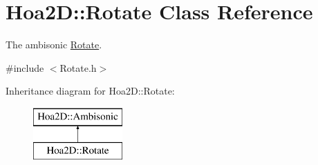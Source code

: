 \hypertarget{class_hoa2_d_1_1_rotate}{\section{Hoa2\-D\-:\-:Rotate Class Reference}
\label{class_hoa2_d_1_1_rotate}
}


The ambisonic \hyperlink{class_hoa2_d_1_1_rotate}{Rotate}.  




{\ttfamily \#include $<$Rotate.\-h$>$}

Inheritance diagram for Hoa2\-D\-:\-:Rotate\-:\begin{figure}[H]
\begin{center}
\leavevmode
\includegraphics[height=2.000000cm]{class_hoa2_d_1_1_rotate}
\end{center}
\end{figure}
